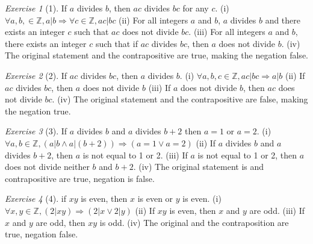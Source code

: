 \documentclass[12pt]{amsart}
\theoremstyle{remark}
\newtheorem*{exercise}{Exercise}%
\newcommand{\ZZ}{\ensuremath{\mathbb Z}}
\theoremstyle{mycomment}
\begin{document}
\begin{exercise}[1] If $a$ divides $b$, then $ac$ divides $bc$ for any $c$. \newline \newline
	(i) $ \forall a,b, \in \ZZ, a|b \Rightarrow \forall c \in \ZZ, ac|bc$ \newline
	(ii) For all integers $a$ and $b$, $a$ divides $b$ and there exists an integer $c$ such that $ac$ does not divide $bc$.\newline
	(iii) For all integers $a$ and $b$, there exists an integer $c$ such that if $ac$ divides $bc$, then $a$ does not divide $b$.\newline
	(iv) The original statement and the contrapositive are true, making the negation false.\newline

\end{exercise}

\begin{exercise}[2] If $ac$ divides $bc$, then $a$ divides $b$. \newline \newline
	(i) $ \forall a, b, c \in \ZZ, ac | bc \Rightarrow a | b$ \newline
	(ii) If $ac$ divides $bc$, then $a$ does not divide $b$\newline
	(iii) If $a$ does not divide $b$, then $ac$ does not divide $bc$.\newline
	(iv) The original statement and the contrapositive are false, making the negation true. \newline
\end{exercise}

\begin{exercise}[3] If $a$ divides $b$ and $a$ divides $b + 2$ then $a = 1$ or $a = 2$. \newline \newline
	(i) $\forall a,b \in \ZZ, (a | b \land  a | (b + 2)) \Rightarrow (a = 1 \lor a = 2)$\newline
	(ii) If $a$ divides $b$ and $a$ divides $b + 2$, then $a$ is not equal to 1 or 2.\newline
	(iii) If $a$ is not equal to 1 or 2, then $a$ does not divide neither $b$ and $b + 2.$\newline
	(iv) The original statement is and contrapositive are true, negation is false.\newline
\end{exercise}

\begin{exercise}[4] if $xy$ is even, then $x$ is even or $y$ is even. \newline \newline
	(i) $\forall x,y \in \ZZ, (2 | xy) \Rightarrow (2 | x \lor 2 | y)$\newline
	(ii) If $xy$ is even, then $x$ and $y$ are odd.\newline
	(iii) If $x$ and $y$ are odd, then $xy$ is odd.\newline
	(iv) The original and the contraposition are true, negation false.\newline
\end{exercise}
\end{document}
